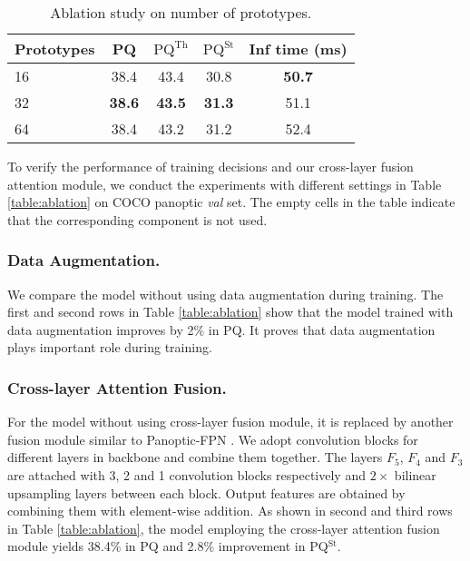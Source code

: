 \documentclass[runningheads]{llncs}
\begin{document}
\begin{table}[!tb]
\centering
     \caption{Ablation study on number of prototypes.}
\begin{tabular}{l  | c c c c}
    \hline
    Prototypes &   PQ                   & $\text{PQ}^{\text{Th}}$ & $\text{PQ}^{\text{St}}$ & Inf time (ms) \\ \hline \hline
         16    & 38.4 & 43.4 & 30.8 & \textbf{50.7}\\ \hline
          32   & \textbf{38.6} & \textbf{43.5} & \textbf{31.3} & 51.1\\ \hline
        64     & 38.4 & 43.2 & 31.2  & 52.4 \\ \hline
    
    \end{tabular}
    \label{table:ablation_prototypes}
\end{table}

To verify the performance of training decisions and our cross-layer fusion attention module, we conduct the experiments with different settings in Table \ref{table:ablation} on COCO panoptic \emph{val} set. The empty cells in the table indicate that the corresponding component is not used.

\subsubsection{Data Augmentation.}
We compare the model without using data augmentation during training. The first and second rows in Table \ref{table:ablation} show that the model trained with data augmentation improves by 2\% in PQ. It proves that data augmentation plays important role during training.

\subsubsection{Cross-layer Attention Fusion.}
For the model without using cross-layer fusion module, it is replaced by another fusion module similar to Panoptic-FPN \cite{DeGeus2018a}. We adopt convolution blocks for different layers in backbone and combine them together. The layers $F_5$, $F_4$ and $F_3$ are attached with 3, 2 and 1 convolution blocks respectively and $2\times$ bilinear upsampling layers between each block. Output features are obtained by combining them with element-wise addition. As shown in second and third rows in Table \ref{table:ablation}, the model employing the cross-layer attention fusion module yields 38.4\% in PQ and 2.8\% improvement in PQ$^{\text{St}}$.
\end{document}
